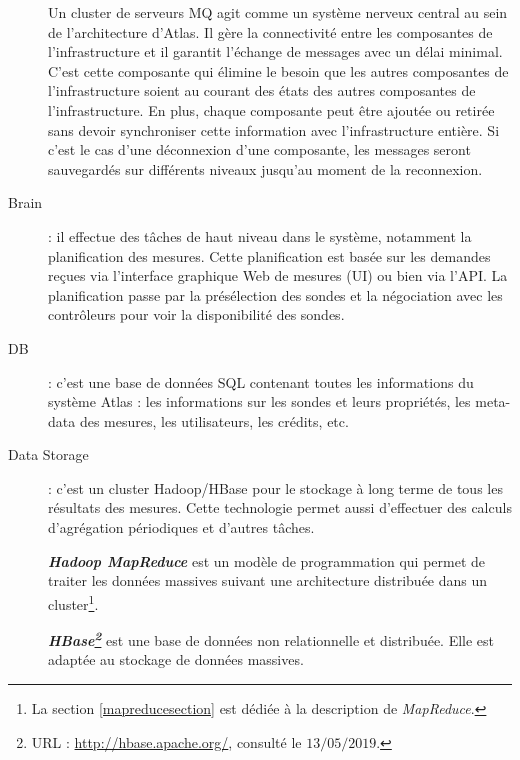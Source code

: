 \begin{description}
	Un cluster de serveurs MQ  agit comme un système nerveux central au sein de l'architecture d'Atlas. Il gère la connectivité entre les composantes de l'infrastructure et  il garantit l'échange de messages avec un délai minimal. C'est cette composante qui élimine le besoin que les autres composantes de l'infrastructure soient au courant des états des autres composantes de l'infrastructure. En plus, chaque composante peut être ajoutée ou retirée sans devoir synchroniser cette information avec l'infrastructure entière. Si c'est le cas d'une déconnexion d'une composante, les messages seront sauvegardés sur différents niveaux jusqu'au moment de la reconnexion.
	
	


	
	\item [Brain] : il effectue des tâches de haut niveau dans le système, notamment la planification des mesures. Cette planification est basée sur les demandes reçues via l'interface graphique Web de mesures (UI) ou bien via l'API. La planification passe par la  présélection des sondes  et la négociation avec les contrôleurs pour voir la disponibilité des sondes. 
	
	
	\item [DB] : c'est une base de données SQL contenant toutes les informations du système  Atlas : les informations sur les sondes et leurs propriétés, les meta-data des mesures, les utilisateurs, les crédits, etc. 
	
	\item [Data Storage] : c'est un cluster Hadoop/HBase pour le stockage à long terme de tous les résultats des mesures. Cette technologie permet aussi d'effectuer des calculs d'agrégation périodiques et  d'autres tâches. 
	
	
	\begin{tcolorbox}
		\textbf{\textit{Hadoop MapReduce}} est un modèle de programmation qui permet de traiter les données massives suivant une architecture distribuée dans un cluster\footnote{La section  \ref{mapreducesection} est dédiée à la description de \textit{MapReduce}.}.
		
		\textbf{ \textit{HBase\footnote{URL : \url{http://hbase.apache.org/}, consulté le $13/05/2019$.}}} est une base de données non relationnelle et distribuée. Elle est adaptée au stockage de données massives.
	\end{tcolorbox} 
	
\end{description}

